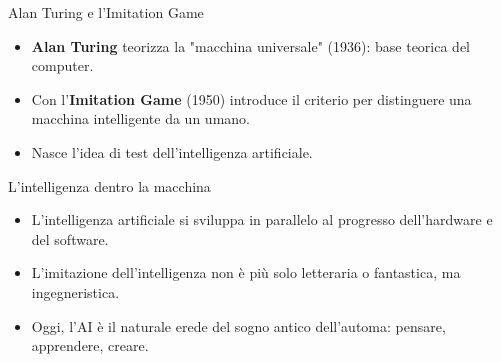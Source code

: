 \documentclass{beamer}
\begin{document}
%
%
\begin{frame}{Alan Turing e l’Imitation Game}
  \begin{itemize}
    \item \textbf{Alan Turing} teorizza la "macchina universale" (1936): base teorica del computer.
    \item Con l'\textbf{Imitation Game} (1950) introduce il criterio per distinguere una macchina intelligente da un umano.
    \item Nasce l’idea di test dell’intelligenza artificiale.
  \end{itemize}
\end{frame}
%
%
\begin{frame}{L’intelligenza dentro la macchina}
  \begin{itemize}
    \item L’intelligenza artificiale si sviluppa in parallelo al progresso dell’hardware e del software.
    \item L’imitazione dell’intelligenza non è più solo letteraria o fantastica, ma ingegneristica.
    \item Oggi, l’AI è il naturale erede del sogno antico dell’automa: pensare, apprendere, creare.
  \end{itemize}
\end{frame}
%
\end{document}
